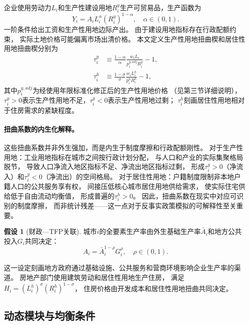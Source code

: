 \documentclass[UTF8,a4paper,12pt]{ctexart}
\theoremstyle{plain}
\theoremstyle{definition}
\newtheorem{assumption}{假设}
\theoremstyle{remark}
\newcommand{\Ry}{R^{y}}
\newcommand{\Rh}{R^{h}}
\newcommand{\tauy}{\tau^{y}}
\newcommand{\tauh}{\tau^{h}}
\begin{document}
企业使用劳动力$L_i$和生产性建设用地$\Ry_i$生产可贸易品，生产函数为
\begin{equation}
  Y_i=A_i L_i^\alpha(\Ry_i)^{1-\alpha},\quad \alpha\in(0,1).
  \label{eq:production}
\end{equation}
一阶条件给出工资和生产性用地边际产出。
由于建设用地指标存在行政配额约束，
实际土地价格可能偏离市场出清价格。
本文定义生产性用地扭曲楔和居住性用地扭曲楔分别为
\begin{align}
  \tauy_i &\equiv \frac{1-\alpha}{\alpha}\frac{w_iL_i}{p_i^{y,adj}\Ry_i}-1,
  \label{eq:wedge_ry}\\
  \tauh_i &\equiv \frac{1-\sigma}{\sigma}\frac{w_iL_i^h}{p_i^h\Rh_i}-1,
  \label{eq:wedge_rh}
\end{align}
其中$p_i^{y,adj}$为经使用年限标准化修正后的生产性用地价格
（见第三节详细说明），
$\tauy_i>0$表示生产性用地不足，$\tauy_i<0$表示生产性用地过剩；
$\tauh_i$刻画居住性用地相对于住房需求的紧缺程度。

\paragraph{扭曲系数的内生化解释。}
这些扭曲系数并非外生强加，而是内生于制度摩擦和行政配额刚性。
对于生产性用地：工业用地指标在城市之间按行政计划分配，
与人口和产业的实际集聚格局脱节，
导致人口净流入地区指标不足、净流出地区指标过剩，
形成$\tauy_i>0$（净流入）和$\tauy_i<0$（净流出）的空间格局。
对于居住性用地：户籍制度限制非本地户籍人口的公共服务享有权，
间接压低核心城市居住用地供给需求，
使实际住宅供给低于自由流动均衡值，
形成普遍的$\tauh_i>0$。
因此，扭曲系数在现实中对应可识别的制度摩擦，
而非统计残差——这一点对于反事实政策模拟的可解释性至关重要。

\begin{assumption}[财政—TFP关联]
  \label{ass:tfp}
  城市$i$的全要素生产率由外生基础生产率$\bar{A}_i$和地方公共投入$G_i$共同决定：
  \begin{equation}
    A_i=\bar{A}_i^{1-\rho}G_i^\rho,\quad \rho\in(0,1).
    \label{eq:tfp}
  \end{equation}
\end{assumption}
这一设定刻画地方政府通过基础设施、公共服务和营商环境影响企业生产率的渠道。
房地产部门使用建筑劳动和居住性用地生产住房，
满足$H_i=(L_i^h)^\sigma(\Rh_i)^{1-\sigma}$，
住房价格由开发成本和居住性用地扭曲共同决定。

\subsection{动态模块与均衡条件}
\end{document}
